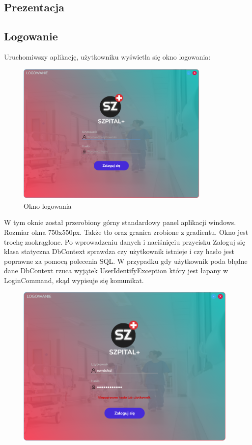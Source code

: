 \begin{flushleft}
\section{\LARGE{Prezentacja}}
\end{flushleft}

\begin{flushleft}
    \subsection{\Large{Logowanie}}
    \hspace{5mm}Uruchomiwszy aplikację, użytkowniku wyświetla się okno logowania:
    \begin{figure}[H]
	\begin{center}
	\includegraphics[height=7cm]{images/log_widok.png}
        \caption{Okno logowania}
        \label{fig:okn_log}
	\end{center}
    \end{figure}
    \hspace{5mm}W tym oknie został przerobiony górny standardowy panel aplikacji windows. Rozmiar okna 750x550px. Także tło oraz granica zrobione z gradientu. Okno jest trochę zaokrąglone. Po wprowadzeniu danych i naciśnięciu przycisku \textquotedbl Zaloguj się\textquotedbl{} klasa statyczna DbContext sprawdza czy użytkownik istnieje i czy hasło jest poprawne za pomocą polecenia SQL. W przypadku gdy użytkownik poda błędne dane DbContext rzuca wyjątek \textquotedbl UserIdentifyException\textquotedbl{} który jest łapany w LoginCommand, skąd wypisuje się komunikat.
    \begin{figure}[H]
	\begin{center}
	\includegraphics[height=8cm]{images/niep_uzyt.png}

\end{center}
\end{figure}
\end{flushleft}
